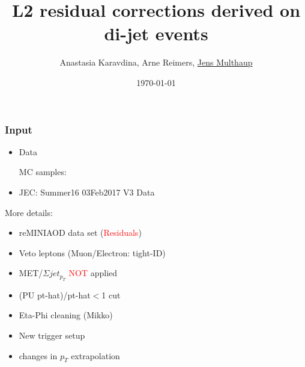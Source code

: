 \documentclass[t,compress]{beamer}
\title[L2 residual corrections]{L2 residual corrections derived on di-jet events}
\author[Jens Multhaup]{Anastasia Karavdina, Arne Reimers, \underline{Jens Multhaup}}
\institute[UHH]{University of Hamburg}
\date{\today}
\begin{document}
\begin{frame}
 \titlepage
\end{frame}

 \begin{frame}
  \frametitle{Input}
  \begin{itemize}
   \item Data
   \begin{itemize}
  \end{itemize}
   MC samples:
    \begin{itemize}
    \end{itemize}
  \item JEC: Summer16 03Feb2017 V3 Data
  \end{itemize}

More details:
\begin{itemize}
\item reMINIAOD data set (\textcolor{red}{Residuals})
\item Veto leptons (Muon/Electron: tight-ID)
\item MET/$\Sigma jet_{p_T}$ \textcolor{red}{NOT} applied 
\item (PU pt-hat)/pt-hat$<$1 cut
\item Eta-Phi cleaning (Mikko)
\item New trigger setup
\item changes in $p_T$ extrapolation
 \end{itemize}
 \end{frame}
 
\end{document}
